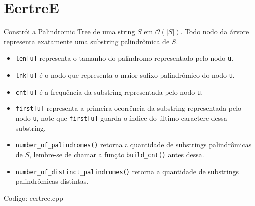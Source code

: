 \documentclass[10pt, a4paper, oneside]{book}
\begin{document}
\section{EertreE}


Constrói a Palindromic Tree de uma string $S$ em $\mathcal{O}(|S|)$. Todo nodo da árvore representa exatamente uma substring palindrômica de $S$.



\begin{itemize}
\item \texttt{len[u]} representa o tamanho do palíndromo representado pelo nodo \texttt{u}.
\item \texttt{lnk[u]} é o nodo que representa o maior sufixo palindrômico do nodo \texttt{u}.
\item \texttt{cnt[u]} é a frequência da substring representada pelo nodo \texttt{u}.
\item \texttt{first[u]} representa a primeira ocorrência da substring representada pelo nodo \texttt{u}, note que \texttt{first[u]} guarda o índice do último caractere dessa substring.
\item \texttt{number\_of\_palindromes()} retorna a quantidade de substrings palindrômicas de $S$, lembre-se de chamar a função \texttt{build\_cnt()} antes dessa.
\item \texttt{number\_of\_distinct\_palindromes()} retorna a quantidade de substrings palindrômicas distintas.
\end{itemize}

\hfill

Codigo: eertree.cpp
\end{document}
